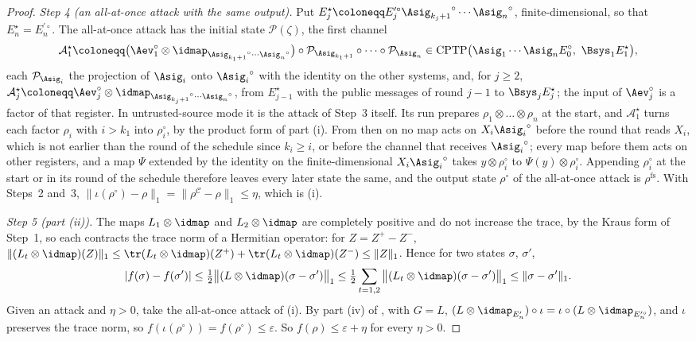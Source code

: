 \begin{proof}
\emph{Step 4 (an all-at-once attack with the same output).} Put
$E^{\star}_j\coloneqq E_j^{\prime\circ}{\Asig_{k_j+1}}^{\circ}\cdots
{\Asig_n}^{\circ}$, finite-dimensional, so that $E^{\star}_n=E_n^{\prime\circ}$.
The all-at-once attack has the initial state $\mathcal{P}(\zeta)$, the first
channel
\begin{equation*}
  \mathcal{A}^{\star}_1\coloneqq
  \big(\Aev^{\circ}_1\otimes\idmap_{{\Asig_{k_1+1}}^{\circ}\cdots{\Asig_n}^{\circ}}\big)
  \circ\mathcal{P}_{\Asig_{k_1+1}}\circ\dots\circ\mathcal{P}_{\Asig_n}
  \in\mathrm{CPTP}\big(\Asig_1\cdots\Asig_nE_0^{\circ},\ \Bsys_1E^{\star}_1\big),
\end{equation*}
each $\mathcal{P}_{\Asig_i}$ the projection of $\Asig_i$ onto
${\Asig_i}^{\circ}$ with the identity on the other systems, and, for $j\ge2$,
$\mathcal{A}^{\star}_j\coloneqq\Aev^{\circ}_j\otimes
\idmap_{{\Asig_{k_j+1}}^{\circ}\cdots{\Asig_n}^{\circ}}$, from $E^{\star}_{j-1}$
with the public messages of round $j-1$ to $\Bsys_jE^{\star}_j$; the input
of $\Aev^{\circ}_j$ is a factor of that register. In untrusted-source mode it
is the attack of Step~3 itself. Its run prepares
$\rho_1\otimes\dots\otimes\rho_n$ at the start, and $\mathcal{A}^{\star}_1$
turns each factor $\rho_i$ with $i>k_1$ into $\rho_i^{\circ}$, by the product
form of part (i). From then on no map acts on $X_i{\Asig_i}^{\circ}$ before
the round that reads $X_i$, which is not earlier than the round of the
schedule since $k_i\ge i$, or before the channel that receives
${\Asig_i}^{\circ}$; every map before them acts on other registers, and a map
$\Psi$ extended by the identity on the finite-dimensional
$X_i{\Asig_i}^{\circ}$ takes $y\otimes\rho_i^{\circ}$ to
$\Psi(y)\otimes\rho_i^{\circ}$. Appending $\rho_i^{\circ}$ at the start or in
its round of the schedule therefore leaves every later state the same, and
the output state $\rho^{\circ}$ of the all-at-once attack is
$\rho^{\mathrm{fs}}$. With Steps~2 and~3,
$\|\iota(\rho^{\circ})-\rho\|_1=\|\rho^{\mathcal{C}}-\rho\|_1\le\eta$, which
is (i).

\emph{Step 5 (part (ii)).} The maps $L_1\otimes\idmap$ and $L_2\otimes\idmap$
are completely positive and do not increase the trace, by the Kraus form of
Step~1, so each contracts the trace norm of a Hermitian operator: for
$Z=Z^{+}-Z^{-}$, $\|(L_t\otimes\idmap)(Z)\|_1\le\tr(L_t\otimes\idmap)(Z^{+})
+\tr(L_t\otimes\idmap)(Z^{-})\le\|Z\|_1$. Hence for two states $\sigma$,
$\sigma'$,
\begin{equation*}
  |f(\sigma)-f(\sigma')|\le\tfrac12\big\|(L\otimes\idmap)(\sigma-\sigma')\big\|_1
  \le\tfrac12\sum_{t=1,2}\big\|(L_t\otimes\idmap)(\sigma-\sigma')\big\|_1
  \le\|\sigma-\sigma'\|_1 .
\end{equation*}
Given an attack and $\eta>0$, take the all-at-once attack of (i). By part
(iv) of , with $G=L$,
$(L\otimes\idmap_{E'_n})\circ\iota=\iota\circ(L\otimes\idmap_{E_n^{\prime\circ}})$,
and $\iota$ preserves the trace norm, so $f(\iota(\rho^{\circ}))=f(\rho^{\circ})
\le\varepsilon$. So $f(\rho)\le\varepsilon+\eta$ for every $\eta>0$.


\end{proof}
